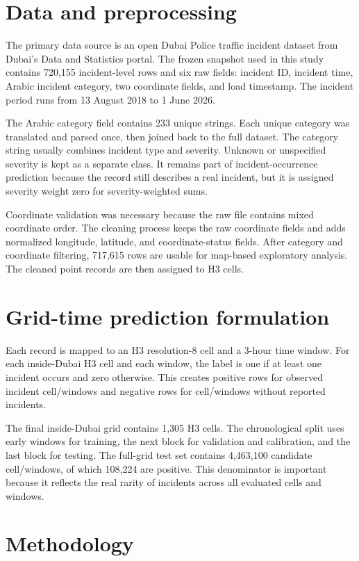 \documentclass[conference]{IEEEtran}
\begin{document}
\section{Data and preprocessing}

The primary data source is an open Dubai Police traffic incident dataset from Dubai's Data and Statistics portal. The frozen snapshot used in this study contains 720,155 incident-level rows and six raw fields: incident ID, incident time, Arabic incident category, two coordinate fields, and load timestamp. The incident period runs from 13 August 2018 to 1 June 2026.

The Arabic category field contains 233 unique strings. Each unique category was translated and parsed once, then joined back to the full dataset. The category string usually combines incident type and severity. Unknown or unspecified severity is kept as a separate class. It remains part of incident-occurrence prediction because the record still describes a real incident, but it is assigned severity weight zero for severity-weighted sums.

Coordinate validation was necessary because the raw file contains mixed coordinate order. The cleaning process keeps the raw coordinate fields and adds normalized longitude, latitude, and coordinate-status fields. After category and coordinate filtering, 717,615 rows are usable for map-based exploratory analysis. The cleaned point records are then assigned to H3 cells.

\section{Grid-time prediction formulation}

Each record is mapped to an H3 resolution-8 cell and a 3-hour time window. For each inside-Dubai H3 cell and each window, the label is one if at least one incident occurs and zero otherwise. This creates positive rows for observed incident cell/windows and negative rows for cell/windows without reported incidents.

The final inside-Dubai grid contains 1,305 H3 cells. The chronological split uses early windows for training, the next block for validation and calibration, and the last block for testing. The full-grid test set contains 4,463,100 candidate cell/windows, of which 108,224 are positive. This denominator is important because it reflects the real rarity of incidents across all evaluated cells and windows.

\section{Methodology}
\end{document}
